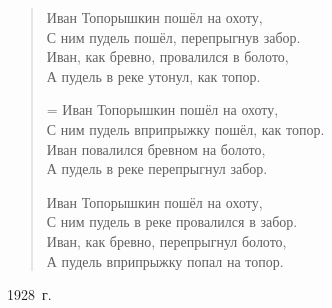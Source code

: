 \newlength{\poemoffset}
\setlength{\poemoffset}{1cm}
\begin{verse}

\leftskip=3pt
Иван Топорышкин пошёл на охоту, \\
С ним пудель пошёл, перепрыгнув забор. \\
Иван, как бревно, провалился в болото, \\
А пудель в реке утонул, как топор.

\bigskip

\leftskip=\poemoffset 
Иван Топорышкин пошёл на охоту, \\
С ним пудель вприпрыжку пошёл, как топор. \\
Иван повалился бревном на болото, \\
А пудель в реке перепрыгнул забор.

\bigskip

\poemoffset
Иван Топорышкин пошёл на охоту, \\
С ним пудель в реке провалился в забор. \\
Иван, как бревно, перепрыгнул болото, \\
А пудель вприпрыжку попал на топор.

\end{verse}
\hfill  1928~г.
